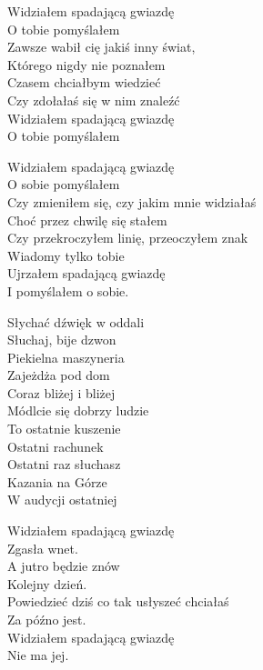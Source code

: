 \begin{text}
Widziałem spadającą gwiazdę\\
O tobie pomyślałem\\
Zawsze wabił cię jakiś inny świat,\\
Którego nigdy nie poznałem\\
Czasem chciałbym wiedzieć\\
Czy zdołałaś się w nim znaleźć\\
Widziałem spadającą gwiazdę\\
O tobie pomyślałem

Widziałem spadającą gwiazdę\\
O sobie pomyślałem\\
Czy zmieniłem się, czy jakim mnie widziałaś\\
Choć przez chwilę się stałem\\
Czy przekroczyłem linię, przeoczyłem znak\\
Wiadomy tylko tobie\\
Ujrzałem spadającą gwiazdę\\
I pomyślałem o sobie.

Słychać dźwięk w oddali\\
Słuchaj, bije dzwon\\
Piekielna maszyneria\\
Zajeżdża pod dom\\
Coraz bliżej i bliżej\\
Módlcie się dobrzy ludzie\\
To ostatnie kuszenie\\
Ostatni rachunek\\
Ostatni raz słuchasz\\
Kazania na Górze\\
W audycji ostatniej

Widziałem spadającą gwiazdę\\
Zgasła wnet.\\
A jutro będzie znów\\
Kolejny dzień.\\
Powiedzieć dziś co tak usłyszeć chciałaś\\
Za późno jest.\\
Widziałem spadającą gwiazdę\\
Nie ma jej.\\
\end{text}
